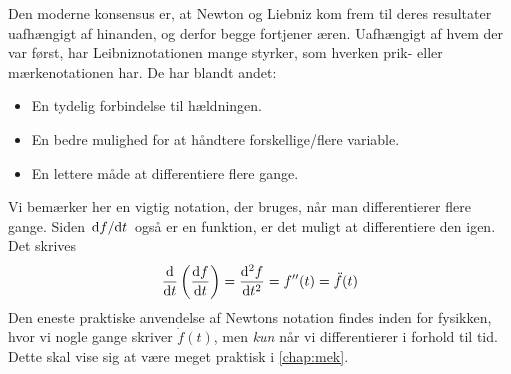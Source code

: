 Den moderne konsensus er, at Newton og Liebniz kom frem til deres resultater uafhængigt af hinanden, og derfor begge fortjener æren. Uafhængigt af hvem der var først, har Leibniznotationen mange styrker, som hverken prik- eller mærkenotationen har. De har blandt andet:
%
\begin{itemize}
    \item En tydelig forbindelse til hældningen.
    \item En bedre mulighed for at håndtere forskellige/flere variable.
    \item En lettere måde at differentiere flere gange.
\end{itemize}
%
Vi bemærker her en vigtig notation, der bruges, når man differentierer flere gange. Siden $\dv*{f}{t}$ også er en funktion, er det muligt at differentiere den igen. Det skrives
%
\begin{align}
    \dv{}{t} \left(\dv{f}{t}(t)\right) = \dv[2]{f}{t}=f''(t) = \ddot{f}(t)
\end{align}
%
Den eneste praktiske anvendelse af Newtons notation findes inden for fysikken, hvor vi nogle gange skriver $\dot{f}(t)$, men \emph{kun} når vi differentierer i forhold til tid. Dette skal vise sig at være meget praktisk i \cref{chap:mek}.

